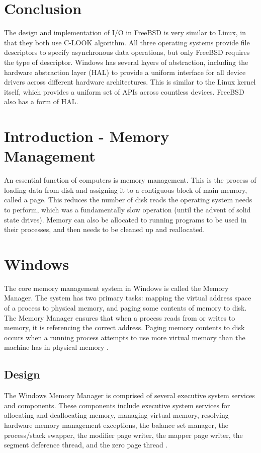 \documentclass[letterpaper,draftclsnofoot,10pt,onecolumn,titlepage]{IEEEtran}\usepackage[margin=0.75in]{geometry}
\begin{document}
\section{Conclusion}
The design and implementation of I/O in FreeBSD is very similar to Linux, in that they both use C-LOOK algorithm.
All three operating systems provide file descriptors to specify asynchronous data operations, but only FreeBSD
requires the type of descriptor. Windows has several layers of abstraction, including the hardware 
abstraction layer (HAL) to provide a uniform interface for all device drivers across different hardware 
architectures. This is similar to the Linux kernel itself, which provides a uniform set of APIs across 
countless devices. FreeBSD also has a form of HAL.



\section{Introduction - Memory Management}
An essential function of computers is memory management. This is the process of loading data from disk and assigning
it to a contiguous block of main memory, called a page. This reduces the number of disk reads the operating system 
needs to perform, which was a fundamentally slow operation (until the advent of solid state drives). Memory can 
also be allocated to running programs to be used in their processes, and then needs to be cleaned up and 
reallocated.


\section{Windows}
The core memory management system in Windows is called the Memory Manager. The system has two primary tasks: mapping 
the virtual address space of a process to physical memory, and paging some contents of memory to disk. The Memory 
Manager ensures that when a process reads from or writes to memory, it is referencing the correct address. Paging 
memory contents to disk occurs when a running process attempts to use more virtual memory than the machine
has in physical memory \cite{windows}.

\subsection{Design}
The Windows Memory Manager is comprised of several executive system services and components. These components 
include executive system services for allocating and deallocating memory, managing virtual 
memory, resolving hardware memory management exceptions, the balance set manager, the process/stack swapper, 
the modifier page writer, the mapper page writer, the segment deference thread, and the zero page thread \cite{windows}.
\end{document}
